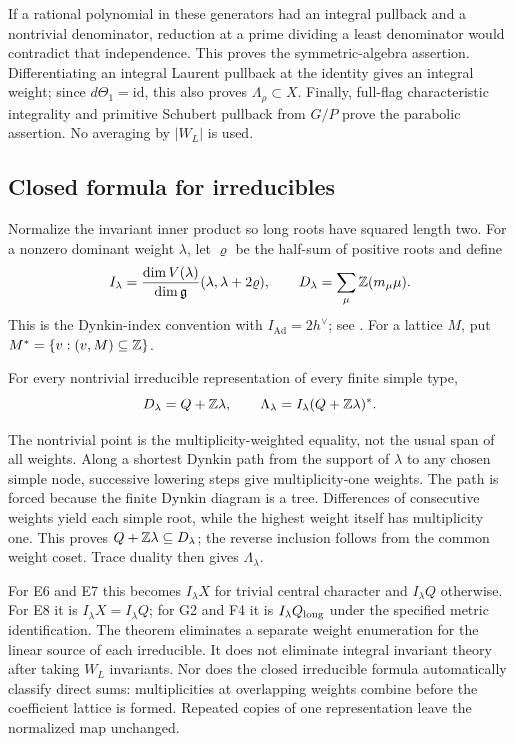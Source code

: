 If a rational polynomial in these generators had an integral pullback and a nontrivial denominator, reduction at a prime dividing a least denominator would contradict that independence. This proves the symmetric-algebra assertion. Differentiating an integral Laurent pullback at the identity gives an integral weight; since $d\Theta_1=\mathrm{id}$, this also proves $\Lambda_\rho\subset X$. Finally, full-flag characteristic integrality and primitive Schubert pullback from $G/P$ prove the parabolic assertion. No averaging by $|W_L|$ is used.

\subsection{Closed formula for irreducibles}
Normalize the invariant inner product so long roots have squared length two. For a nonzero dominant weight $\lambda$, let $\varrho$ be the half-sum of positive roots and define
\[
 I_\lambda=\frac{\dim V(\lambda)}{\dim\mathfrak g}
 (\lambda,\lambda+2\varrho),\qquad D_\lambda=\sum_\mu\mathbb Z(m_\mu\mu).
\]
This is the Dynkin-index convention with $I_{\mathrm{Ad}}=2h^\vee$; see \cite{Panyushev}. For a lattice $M$, put $M^*=\{v:(v,M)\subseteq\mathbb Z\}$.

\begin{theorem}
For every nontrivial irreducible representation of every finite simple type,
\[
 D_\lambda=Q+\mathbb Z\lambda,\qquad
 \Lambda_\lambda=I_\lambda(Q+\mathbb Z\lambda)^*.
\]
\end{theorem}
The nontrivial point is the multiplicity-weighted equality, not the usual span of all weights. Along a shortest Dynkin path from the support of $\lambda$ to any chosen simple node, successive lowering steps give multiplicity-one weights. The path is forced because the finite Dynkin diagram is a tree. Differences of consecutive weights yield each simple root, while the highest weight itself has multiplicity one. This proves $Q+\mathbb Z\lambda\subseteq D_\lambda$; the reverse inclusion follows from the common weight coset. Trace duality then gives $\Lambda_\lambda$.

For E6 and E7 this becomes $I_\lambda X$ for trivial central character and $I_\lambda Q$ otherwise. For E8 it is $I_\lambda X=I_\lambda Q$; for G2 and F4 it is $I_\lambda Q_{\rm long}$ under the specified metric identification. The theorem eliminates a separate weight enumeration for the linear source of each irreducible. It does not eliminate integral invariant theory after taking $W_L$ invariants. Nor does the closed irreducible formula automatically classify direct sums: multiplicities at overlapping weights combine before the coefficient lattice is formed. Repeated copies of one representation leave the normalized map unchanged.

